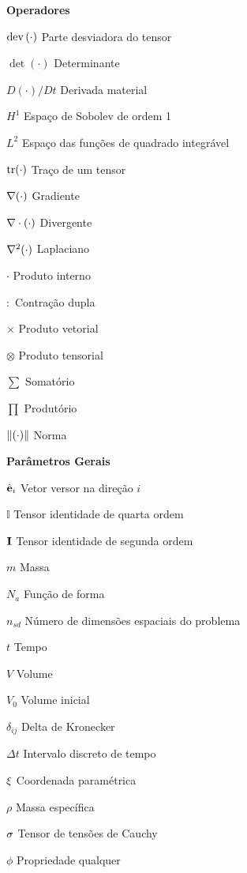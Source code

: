 \begin{simbolos}
    \item[\textbf{Operadores}]
    \item[$\mathop{\mathrm{dev}}\nolimits{(}\cdot)$] Parte desviadora do tensor
    \item[$\det{(\cdot)}$] Determinante
    \item[$D(\cdot)/Dt$] Derivada material
    \item[$H^1$] Espaço de Sobolev de ordem 1
    \item[$L^2$] Espaço das funções de quadrado integrável
    \item[$\mathop{\mathrm{tr}}\nolimits(\cdot)$] Traço de um tensor
    \item[$\mathbf{\nabla}(\cdot)$] Gradiente
    \item[$\mathbf{\nabla}\cdot(\cdot)$] Divergente
    \item[$\mathbf{\nabla}^2(\cdot)$] Laplaciano
    \item[$\cdot$] Produto interno
    \item[$:$] Contração dupla
    \item[$\times$] Produto vetorial
    \item[$\otimes$] Produto tensorial
    \item[$\sum$] Somatório
    \item[$\prod$] Produtório
    \item[$\left\lVert{(\cdot)}\right\lVert$] Norma

    \item[\textbf{Parâmetros Gerais}]
    \item[$\hat{\mathbf{e}}_i$] Vetor versor na direção $i$
    \item[$\mathbb{I}$] Tensor identidade de quarta ordem
    \item[$\mathbf{I}$] Tensor identidade de segunda ordem
    \item[$m$] Massa
    \item[$N_a$] Função de forma
    \item[$n_{sd}$] Número de dimensões espaciais do problema
    \item[$t$] Tempo
    \item[$V$] Volume
    \item[$V_0$] Volume inicial
    \item[$\delta_{ij}$] Delta de Kronecker
    \item[$\Delta t$] Intervalo discreto de tempo
    \item[$\mathbf{\xi}$] Coordenada paramétrica
    \item[$\rho$] Massa específica
    \item[$\mathbf{\sigma}$] Tensor de tensões de Cauchy
    \item[$\phi$] Propriedade qualquer


\end{simbolos}
